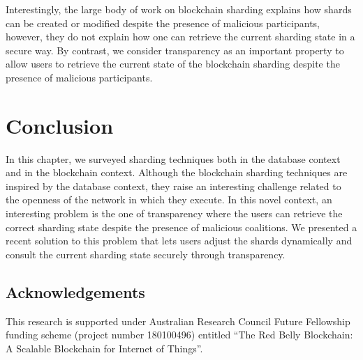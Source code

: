 \documentclass[11pt,dvipdfm]{article}
\newcommand{\vincent}[1]{\emph{Vincent: #1}}%
\newcommand{\deepal}[1]{\emph{Deepal: #1}}%
\begin{document}
Interestingly, the large body of work on blockchain sharding explains how shards can be created or modified despite the presence of malicious participants, however, they do not explain how one can retrieve the current sharding state in a secure way. 
By contrast, we consider transparency as an important property to allow users to retrieve the current state of the blockchain sharding despite the presence of malicious participants.

\section{Conclusion}\label{sec:conclusion}

In this chapter, we surveyed sharding techniques both in the database context and in the blockchain context.
Although the blockchain sharding techniques are inspired by the database context, they raise an interesting challenge related to the openness 
of the network in which they execute.
In this novel context, an interesting problem is the one of transparency where the users can retrieve the correct sharding state despite the 
presence of malicious coalitions. 
We presented a recent solution to this problem that lets users adjust the shards dynamically and consult the current sharding state securely through transparency.


\subsection*{Acknowledgements} 

This research is supported under Australian Research Council Future Fellowship funding scheme (project 
number 180100496) entitled ``The Red Belly Blockchain: A Scalable Blockchain for Internet of Things''.
\end{document}
